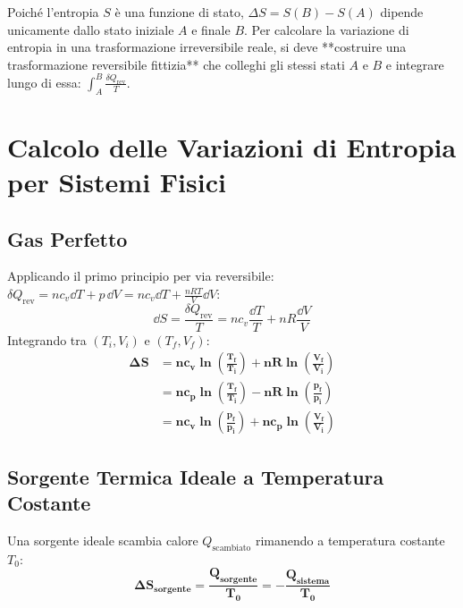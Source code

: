\begin{esame}
Poiché l'entropia $S$ è una funzione di stato, $\Delta S = S(B) - S(A)$ dipende unicamente dallo stato iniziale $A$ e finale $B$. Per calcolare la variazione di entropia in una trasformazione irreversibile reale, si deve **costruire una trasformazione reversibile fittizia** che colleghi gli stessi stati $A$ e $B$ e integrare lungo di essa: $\int_A^B \frac{\delta Q_{\text{rev}}}{T}$.
\end{esame}

\section{Calcolo delle Variazioni di Entropia per Sistemi Fisici}
\label{sec:calcolo_entropia}

\subsection{Gas Perfetto}
Applicando il primo principio per via reversibile: $\delta Q_{\text{rev}} = n c_v \dd T + p\,\dd V = n c_v \dd T + \frac{n R T}{V}\dd V$:
\begin{equation}
    \dd S = \frac{\delta Q_{\text{rev}}}{T} = n c_v \frac{\dd T}{T} + n R \frac{\dd V}{V}
\end{equation}
Integrando tra $(T_i, V_i)$ e $(T_f, V_f)$:
\begin{align}
    \mathbf{\Delta S} &= \mathbf{n c_v \ln\left(\frac{T_f}{T_i}\right) + n R \ln\left(\frac{V_f}{V_i}\right)} \label{eq:ds_tv} \\
    &= \mathbf{n c_p \ln\left(\frac{T_f}{T_i}\right) - n R \ln\left(\frac{p_f}{p_i}\right)} \label{eq:ds_tp} \\
    &= \mathbf{n c_v \ln\left(\frac{p_f}{p_i}\right) + n c_p \ln\left(\frac{V_f}{V_i}\right)} \label{eq:ds_pv}
\end{align}

\subsection{Sorgente Termica Ideale a Temperatura Costante}
Una sorgente ideale scambia calore $Q_{\text{scambiato}}$ rimanendo a temperatura costante $T_0$:
\begin{equation}
    \mathbf{\Delta S_{\text{sorgente}} = \frac{Q_{\text{sorgente}}}{T_0} = -\frac{Q_{\text{sistema}}}{T_0}}
\end{equation}

